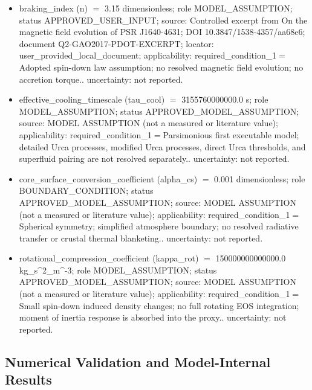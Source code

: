 \documentclass[11pt]{article}
\begin{document}
\begin{itemize}
\item braking\_\allowbreak{}index (n) \ensuremath{=} 3.15 dimensionless; role MODEL\_\allowbreak{}ASSUMPTION; status APPROVED\_\allowbreak{}USER\_\allowbreak{}INPUT; source: Controlled excerpt from On the magnetic field evolution of PSR J1640-4631; DOI 10.3847/\allowbreak{}1538-4357/\allowbreak{}aa68e6; document Q2-GAO2017-PDOT-EXCERPT; locator: user\_\allowbreak{}provided\_\allowbreak{}local\_\allowbreak{}document; applicability: required\_\allowbreak{}condition\_\allowbreak{}1\ensuremath{=}Adopted spin-down law assumption; no resolved magnetic field evolution; no accretion torque.. uncertainty: not reported.
\item effective\_\allowbreak{}cooling\_\allowbreak{}timescale (tau\_\allowbreak{}cool) \ensuremath{=} 3155760000000.0 s; role MODEL\_\allowbreak{}ASSUMPTION; status APPROVED\_\allowbreak{}MODEL\_\allowbreak{}ASSUMPTION; source: MODEL ASSUMPTION (not a measured or literature value); applicability: required\_\allowbreak{}condition\_\allowbreak{}1\ensuremath{=}Parsimonious first executable model; detailed Urca processes, modified Urca processes, direct Urca thresholds, and superfluid pairing are not resolved separately.. uncertainty: not reported.
\item core\_\allowbreak{}surface\_\allowbreak{}conversion\_\allowbreak{}coefficient (alpha\_\allowbreak{}cs) \ensuremath{=} 0.001 dimensionless; role BOUNDARY\_\allowbreak{}CONDITION; status APPROVED\_\allowbreak{}MODEL\_\allowbreak{}ASSUMPTION; source: MODEL ASSUMPTION (not a measured or literature value); applicability: required\_\allowbreak{}condition\_\allowbreak{}1\ensuremath{=}Spherical symmetry; simplified atmosphere boundary; no resolved radiative transfer or crustal thermal blanketing.. uncertainty: not reported.
\item rotational\_\allowbreak{}compression\_\allowbreak{}coefficient (kappa\_\allowbreak{}rot) \ensuremath{=} 150000000000000.0 kg\_\allowbreak{}s\textasciicircum{}2\_\allowbreak{}m\textasciicircum{}-3; role MODEL\_\allowbreak{}ASSUMPTION; status APPROVED\_\allowbreak{}MODEL\_\allowbreak{}ASSUMPTION; source: MODEL ASSUMPTION (not a measured or literature value); applicability: required\_\allowbreak{}condition\_\allowbreak{}1\ensuremath{=}Small spin-down induced density changes; no full rotating EOS integration; moment of inertia response is absorbed into the proxy.. uncertainty: not reported.
\end{itemize}

\subsection{Numerical Validation and Model-Internal Results}
\end{document}
